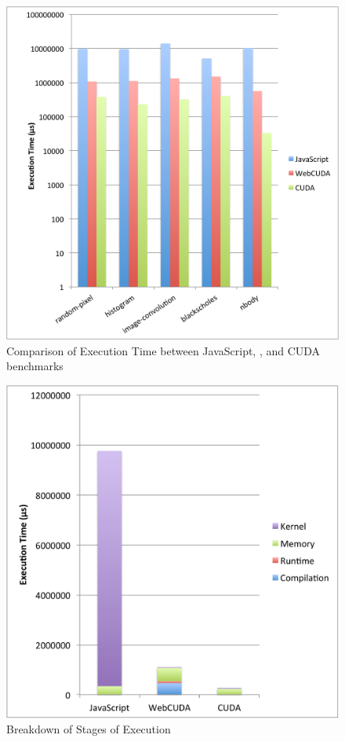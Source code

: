 
\begin{figure}
	\begin{center}
		\includegraphics[width=\columnwidth]{./figures/fig1}
	\end{center}
	\caption{Comparison of Execution Time between JavaScript, \namens, and CUDA benchmarks}
	\label{fig1}
\end{figure}

\begin{figure}
	\begin{center}
		\includegraphics[width=\columnwidth]{./figures/fig2}
	\end{center}
	\caption{Breakdown of Stages of Execution}
	\label{fig2}
\end{figure}

